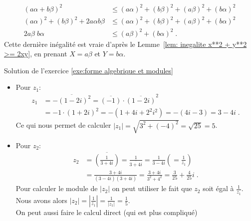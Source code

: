 \begin{corrige}
\begin{dem}
\begin{enumerate}
	            \begin{align*}
	                  (a\alpha + b\beta)^2
	                        & \leq 
	                              (a\alpha)^2 + (b\beta)^2 + (a\beta)^2 + (b\alpha)^2                              \\
	                  (a\alpha)^2 + (b\beta)^2 + 2 a\alpha b\beta 
	                        & \leq 
	                              (a\alpha)^2 + (b\beta)^2 + (a\beta)^2 + (b\alpha)^2                             \\
	                  2 a\beta \; b\alpha
	                        & \leq 
	                              (a\beta)^2 + (b\alpha)^2                                                        \;.
            	      \end{align*}
            	      Cette derni\`ere in\'egalit\'e est vraie d'apr\`es le Lemme~\ref{lem: inegalite x**2 + y**2 >= 2xy},
            	      en prenant $X = a\beta$ et $Y = b \alpha$.
	\end{enumerate} 
\end{dem}
\begin{sol}
\label{sol:forme algebrique et modules}
Solution de l'exercice \ref{exe:forme algebrique et modules} 
\begin{itemize}
	\item Pour $z_1$:
		\begin{align*}
		      z_1 & = \overline{- (1 - 2i)^2} = \overline{(-1)} \cdot \overline{(1-2i)}^2 \\
		          & = -1 \cdot (1+2i)^2 = - (1 + 4i + 2^2 i^2) = - (4i - 3) = 3 - 4i \;.
		\end{align*}
		Ce qui nous permet de calculer $|z_1| = \sqrt{3^2 + (-4)^2} = \sqrt{25} = 5$.
	\item Pour $z_2$:
		\begin{align*}
		      z_2 & = \overline{\left( \frac{1}{3 + 4i} \right) } = \frac{1}{\overline{3 + 4i}}  = \frac{1}{3 - 4i}
		              \left( = \frac{1}{z_1} \right) \\
		          & = \frac{3+4i}{(3-4i)(3+4i)} = \frac{3+4i}{3^2+4^2} = \frac{3}{25} + \frac{4}{25}i \;.
		\end{align*}
		Pour calculer le module de $|z_2|$ on peut utiliser le fait que $z_2$ soit \'egal \`a $\frac{1}{z_1}$. 
		Nous avons alors $|z_2| = |\frac{1}{z_1}| = \frac{1}{|z_1|} = \frac{1}{5}$. \\
		On peut aussi faire le calcul direct (qui est plus compliqu\'e)

\end{itemize}
\end{sol}
\end{corrige}
